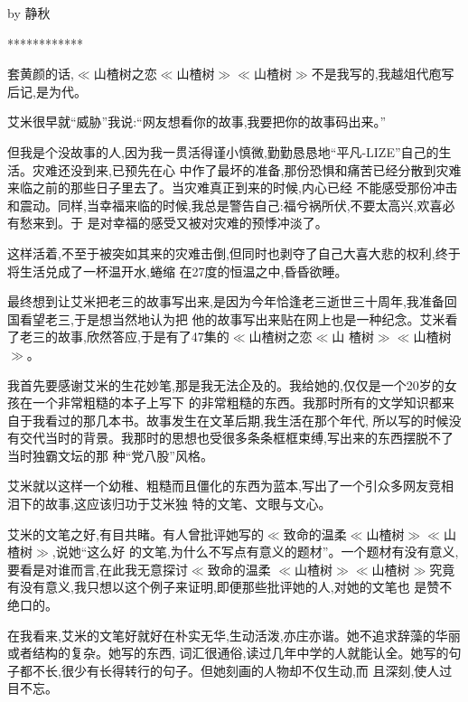 ﻿\documentclass[12pt]{article}
\begin{document}
by 静秋


************


套黄颜的话,$\ll$山楂树之恋$\ll$山楂树$\gg$$\ll$山楂树$\gg$不是我写的,我越俎代庖写后记,是为代。



艾米很早就``威胁''我说:``网友想看你的故事,我要把你的故事码出来。''



但我是个没故事的人,因为我一贯活得谨小慎微,勤勤恳恳地``平凡-LIZE''自己的生活。灾难还没到来,已预先在心
中作了最坏的准备,那份恐惧和痛苦已经分散到灾难来临之前的那些日子里去了。当灾难真正到来的时候,内心已经
不能感受那份冲击和震动。同样,当幸福来临的时候,我总是警告自己:福兮祸所伏,不要太高兴,欢喜必有愁来到。于
是对幸福的感受又被对灾难的预悸冲淡了。



这样活着,不至于被突如其来的灾难击倒,但同时也剥夺了自己大喜大悲的权利,终于将生活兑成了一杯温开水,蜷缩
在27度的恒温之中,昏昏欲睡。



最终想到让艾米把老三的故事写出来,是因为今年恰逢老三逝世三十周年,我准备回国看望老三,于是想当然地认为把
他的故事写出来贴在网上也是一种纪念。艾米看了老三的故事,欣然答应,于是有了47集的$\ll$山楂树之恋$\ll$山
楂树$\gg$$\ll$山楂树$\gg$。



我首先要感谢艾米的生花妙笔,那是我无法企及的。我给她的,仅仅是一个20岁的女孩在一个非常粗糙的本子上写下
的非常粗糙的东西。我那时所有的文学知识都来自于我看过的那几本书。故事发生在文革后期,我生活在那个年代,
所以写的时候没有交代当时的背景。我那时的思想也受很多条条框框束缚,写出来的东西摆脱不了当时独霸文坛的那
种``党八股''风格。



艾米就以这样一个幼稚、粗糙而且僵化的东西为蓝本,写出了一个引众多网友竞相泪下的故事,这应该归功于艾米独
特的文笔、文眼与文心。



艾米的文笔之好,有目共睹。有人曾批评她写的$\ll$致命的温柔$\ll$山楂树$\gg$$\ll$山楂树$\gg$,说她``这么好
的文笔,为什么不写点有意义的题材''。一个题材有没有意义,要看是对谁而言,在此我无意探讨$\ll$致命的温柔
$\ll$山楂树$\gg$$\ll$山楂树$\gg$究竟有没有意义,我只想以这个例子来证明,即便那些批评她的人,对她的文笔也
是赞不绝口的。



在我看来,艾米的文笔好就好在朴实无华,生动活泼,亦庄亦谐。她不追求辞藻的华丽或者结构的复杂。她写的东西,
词汇很通俗,读过几年中学的人就能认全。她写的句子都不长,很少有长得转行的句子。但她刻画的人物却不仅生动,而
且深刻,使人过目不忘。
\end{document}
